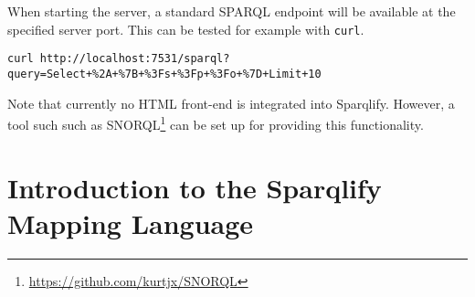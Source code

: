 \documentclass[a4paper,twoside,bibtotoc,abstracton,12pt,BCOR=15mm]{scrreprt}
\begin{document}
\noindent When starting the server, a standard SPARQL endpoint will be available at the specified server port.
This can be tested for example with \texttt{curl}.
\begin{lstlisting}
curl http://localhost:7531/sparql?query=Select+%2A+%7B+%3Fs+%3Fp+%3Fo+%7D+Limit+10
\end{lstlisting}

\noindent Note that currently no HTML front-end is integrated into Sparqlify.
However, a tool such such as SNORQL\footnote{\url{https://github.com/kurtjx/SNORQL}} can be set up for providing this functionality.


\section{Introduction to the Sparqlify Mapping Language}
\label{sec:sparqlify-ml-intro}
\end{document}

